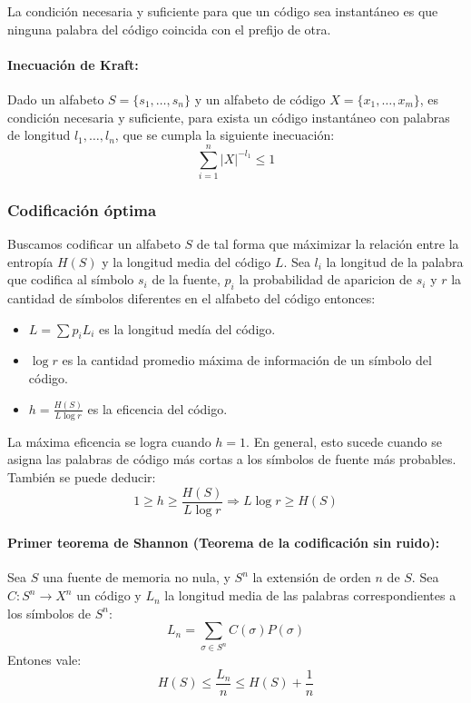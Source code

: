 La condición necesaria y suficiente para que un código sea instantáneo es que ninguna palabra del código coincida con el prefijo de otra.

\paragraph{Inecuación de Kraft:} Dado un alfabeto \(S = \{s_1,\dots,s_n\}\) y un alfabeto de código \(X=\{x_1,\dots,x_m\}\), es condición necesaria y suficiente, para exista un código instantáneo con palabras de longitud \(l_1,\dots,l_{n}\), que se cumpla la siguiente inecuación:
\[\sum_{i=1}^n |X|^{-l_1}\leq 1\]

\subsubsection{Codificación óptima}
Buscamos codificar un alfabeto \(S\) de tal forma que máximizar la relación entre la entropía \(H(S)\) y la longitud media del código \(L\).  Sea \(l_i\) la longitud de la palabra que codifica al símbolo \(s_i\) de la fuente, \(p_i\) la probabilidad de aparicion de \(s_i\) y \(r\) la cantidad de símbolos diferentes en el alfabeto del código entonces:

\begin{itemize}
  \item \(L = \sum p_iL_i \) es la longitud medía del código.
  \item \(\log r\) es la cantidad promedio máxima de información de un símbolo del código.
  \item \(h = \frac{H(S)}{L\log r}\) es la eficencia del código.
\end{itemize}

La máxima eficencia se logra cuando \(h = 1\). En general, esto sucede cuando se asigna las palabras de código más cortas a los símbolos de fuente más probables. También se puede deducir: \[1 \geq h \geq \frac{H(S)}{L\log r}\Rightarrow L\log r \geq H(S)\]

\paragraph{Primer teorema de Shannon (Teorema de la codificación sin ruido):} Sea \(S\) una fuente de memoria no nula, y \(S^n\) la extensión de orden \(n\) de \(S\).  Sea \(C:S^n\to X^n\) un código y \(L_n\) la longitud media de las palabras correspondientes a los símbolos de \(S^n\):
\[
    L_n = \sum_{\sigma\in S^n} C(\sigma)P(\sigma)
\]
Entones vale:
\[
    H(S) \leq \frac{L_n}{n} \leq H(S) + \frac{1}{n}
\]

